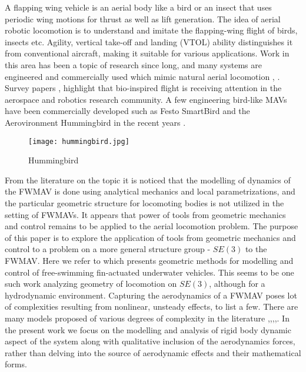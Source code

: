 \documentclass[letterpaper, 10 pt, conference]{ieeeconf}  \newcommand{\RN}[1]{\textup{\uppercase\expandafter{\romannumeral#1}}}
\begin{document}
A flapping wing vehicle is an aerial body like a bird or an insect that uses periodic wing motions for thrust as well as lift generation. The idea of aerial robotic locomotion is to understand and imitate the flapping-wing flight of birds, insects etc. Agility, vertical take-off and landing (VTOL) ability distinguishes it from conventional aircraft, making it suitable for various applications. Work in this area has been a topic of research since long, and many systems are engineered and commercially used which mimic natural aerial locomotion \cite{Taha thesis}, \cite{paranjape review paper}. Survey papers \cite{paranjape review paper}, \cite{Taha review} highlight that bio-inspired flight is receiving attention in the aerospace and robotics research community. A few engineering bird-like MAVs have been commercially developed such as Festo SmartBird and the Aerovironment Hummingbird in the recent years \cite{paranjape review paper}.

\begin{figure}[h!]
\texttt{[image: hummingbird.jpg]} \label{hummingbird}
\caption{Hummingbird}
\end{figure}


From the literature on the topic it is noticed that the modelling of dynamics of the FWMAV is done using analytical mechanics and local parametrizations, and the particular geometric structure for locomoting bodies is not utilized in the setting of FWMAVs. It appears that power of tools from geometric mechanics and control remains to be applied to the aerial locomotion problem. The purpose of this paper is to explore the application of tools from geometric mechanics and control to a problem on a more general structure group - $SE(3)$ to the FWMAV. Here we refer to \cite{Morgansen UUV} which presents geometric methods for modelling and control of free-swimming fin-actuated underwater vehicles. This seems to be one such work analyzing geometry of locomotion on $SE(3)$, although for a hydrodynamic environment. Capturing the aerodynamics of a FWMAV poses lot of complexities resulting from nonlinear, unsteady effects, to list a few. There are many models proposed of various degrees of complexity in the literature \cite{Chung dorothy},\cite{Taha thesis},\cite{Taha Hajj},\cite{Kuang robobat},\cite{paranjape review paper}. In the present work we focus on the modelling and analysis of rigid body dynamic aspect of the system along with qualitative inclusion of the aerodynamics forces, rather than delving into the source of aerodynamic effects and their mathematical forms.
\end{document}
